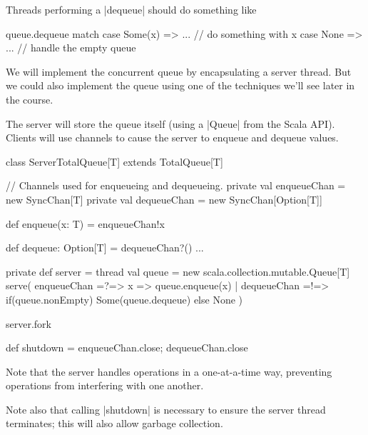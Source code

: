 
\begin{slide}

Threads performing a |dequeue| should do something like
\begin{scala}
  queue.dequeue match{
    case Some(x) => ... // do something with x
    case None => ... // handle the empty queue
  }
\end{scala}
\end{slide}


\begin{slide}

We will implement the concurrent queue by encapsulating a server thread.
But we could also implement the queue using one of the techniques we'll see
later in the course.

The server will store the queue itself (using a |Queue| from the Scala API).
Clients will use channels to cause the server to enqueue and dequeue values.

\begin{scala}
class ServerTotalQueue[T] extends TotalQueue[T]{
  // Channels used for enqueueing and dequeueing.
  private val enqueueChan = new SyncChan[T]
  private val dequeueChan = new SyncChan[Option[T]]

  def enqueue(x: T) = enqueueChan!x

  def dequeue: Option[T] = dequeueChan?()
  ...
}
\end{scala}
\end{slide}


\begin{slide}

\begin{scala}
  private def server = thread{
    val queue = new scala.collection.mutable.Queue[T]
    serve(
      enqueueChan =?=> { x => queue.enqueue(x) }
      | dequeueChan =!=> { if(queue.nonEmpty) Some(queue.dequeue) else None }
    )
  }

  server.fork

  def shutdown = { enqueueChan.close; dequeueChan.close }
\end{scala}

Note that the server handles operations in a one-at-a-time way, preventing
operations from interfering with one another.

Note also that calling |shutdown| is necessary to ensure the server thread
terminates; this will also allow garbage collection. 
\end{slide}


